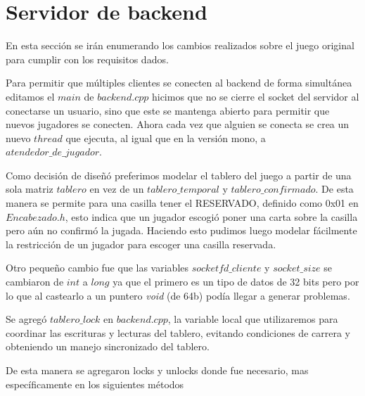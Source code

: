 \section{Servidor de backend}

En esta sección se irán enumerando los cambios realizados sobre el juego original para cumplir con los requisitos dados.

Para permitir que múltiples clientes se conecten al backend de forma simultánea editamos el $main$ de $backend.cpp$ hicimos que no se cierre el socket del servidor al conectarse un usuario, sino que este se mantenga abierto para permitir que nuevos jugadores se conecten. Ahora cada vez que alguien se conecta se crea un nuevo $thread$ que ejecuta, al igual que en la versión mono, a $atendedor\_de\_jugador$.

Como decisión de diseñó preferimos modelar el tablero del juego a partir de una sola matriz $tablero$ en vez de un $tablero\_temporal$ y $tablero\_confirmado$. De esta manera se permite para una casilla tener el RESERVADO, definido como 0x01 en $Encabezado.h$, esto indica que un jugador escogió poner una carta sobre la casilla pero aún no confirmó la jugada. Haciendo esto pudimos luego modelar fácilmente la restricción de un jugador para escoger una casilla reservada.

Otro pequeño cambio fue que las variables $socketfd\_cliente$ y $socket\_size$ se cambiaron de $int$ a $long$ ya que el primero es un tipo de datos de 32 bits pero por lo que al castearlo a un puntero \textit{void} (de 64b) podía llegar a generar problemas.

Se agregó $tablero\_lock$ en $backend.cpp$, la variable local que utilizaremos para coordinar las escrituras y lecturas del tablero, evitando condiciones de carrera y obteniendo un manejo sincronizado del tablero.

De esta manera se agregaron locks y unlocks donde fue necesario, mas específicamente en los siguientes métodos

